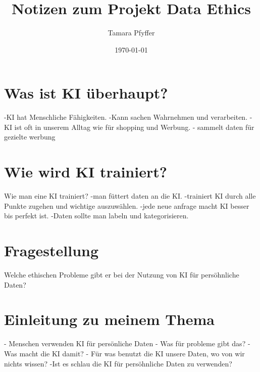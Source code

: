 \documentclass{article}
\title{Notizen zum Projekt Data Ethics}
\author{Tamara Pfyffer}
\date{\today}
\begin{document}
\maketitle


\tableofcontents

\section{Was ist KI überhaupt?}
-KI hat Menschliche Fähigkeiten. -Kann sachen Wahrnehmen und verarbeiten. -KI ist oft in unserem Alltag wie für shopping und Werbung. - sammelt daten für gezielte werbung

\section{Wie wird KI trainiert?}
Wie man eine KI trainiert? -man füttert daten an die KI. -trainiert KI durch alle Punkte zugehen und wichtige auszuwählen. -jede neue anfrage macht KI besser bis perfekt ist. -Daten sollte man labeln und kategorisieren. 

\section{Fragestellung}
Welche ethischen Probleme gibt er bei der Nutzung von KI für persöhnliche Daten? 

\section{Einleitung zu meinem Thema}
- Menschen verwenden KI für persönliche Daten - Was für probleme gibt das? - Was macht die KI damit? - Für was benutzt die KI unsere Daten, wo von wir nichts wissen? -Ist es schlau die KI für persöhnliche Daten zu verwenden? 
\end{document}
